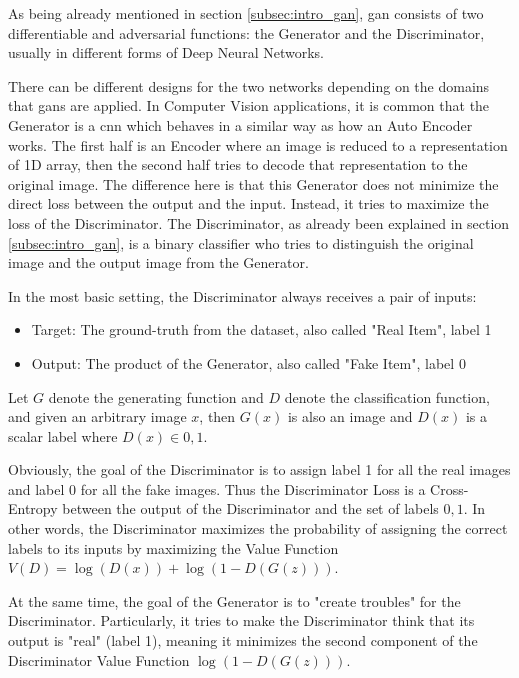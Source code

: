 As being already mentioned in section \ref{subsec:intro_gan}, \acrshort{gan} consists of
two differentiable and adversarial functions: the Generator and the Discriminator, usually
in different forms of Deep Neural Networks.  

There can be different designs for the two networks depending on the domains that
\acrshort{gan}s are applied. In Computer Vision applications, it is common that the
Generator is a \acrfull{cnn} which behaves in a similar way as how an Auto Encoder
\cite{auto_encoder} works. The first half is an Encoder where an image is reduced to a
representation of 1D array, then the second half tries to decode that representation to
the original image. The difference here is that this Generator does not minimize the
direct loss between the output and the input. Instead, it tries to maximize the loss of
the Discriminator. The Discriminator, as already been explained in section
\ref{subsec:intro_gan}, is a binary classifier who tries to distinguish the original image
and the output image from the Generator. 

In the most basic setting, the Discriminator always receives a pair of inputs:

\begin{itemize}
	\item Target: The ground-truth from the dataset, also called "Real Item", label 1
	\item Output: The product of the Generator, also called "Fake Item", label 0
\end{itemize}

Let $G$ denote the generating function and $D$ denote the classification function, and
given an arbitrary image $x$, then $G(x)$ is also an image and $D(x)$ is a scalar label
where $D(x) \in {0, 1}$.

Obviously, the goal of the Discriminator is to assign label 1 for all the real images and
label 0 for all the fake images. Thus the Discriminator Loss is a Cross-Entropy between
the output of the Discriminator and the set of labels ${0, 1}$. In other words, the
Discriminator maximizes the probability of assigning the correct labels to its inputs by
maximizing the Value Function $V(D) = \log(D(x)) + \log(1 - D(G(z)))$.

At the same time, the goal of the Generator is to "create troubles" for the Discriminator.
Particularly, it tries to make the Discriminator think that its output is "real" (label
1), meaning it minimizes the second component of the Discriminator Value Function $\log(1
- D(G(z)))$.

